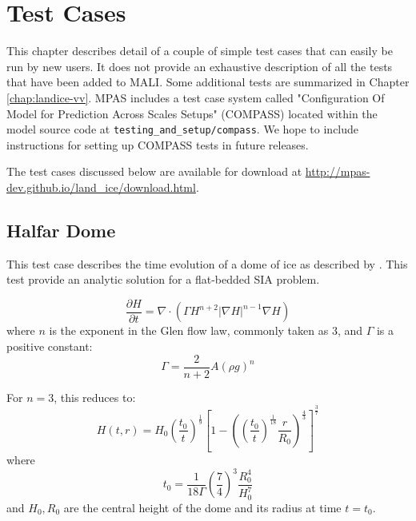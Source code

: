 \chapter{Test Cases}
\label{chap:landice_test_cases}

This chapter describes detail of a couple of simple test cases that can easily be
run by new users.
It does not provide an exhaustive description of all the tests that have been added to MALI.
Some additional tests are summarized in Chapter \ref{chap:landice-vv}.
MPAS includes a test case system called "Configuration Of Model for Prediction Across Scales Setups" (COMPASS)
located within the model source code at {\tt testing\_and\_setup/compass}.
We hope to include instructions for setting up COMPASS tests in future releases.

The test cases discussed below are available for download at \url{http://mpas-dev.github.io/land_ice/download.html}.


\FloatBarrier


\section{Halfar Dome}
\label{sec:halfar_description}
This test case describes the time evolution of a dome of ice as described by \citet{Halfar1983}.
This test provide an analytic solution for a flat-bedded SIA problem.

\begin{equation}
    \frac{\partial H}{\partial t} = \nabla \cdot (\Gamma H^{n+2} |\nabla H|^{n-1} \nabla H)
\end{equation}
where $n$ is the exponent in the Glen flow law, commonly taken as 3, and $\Gamma$ is a positive constant:
\begin{equation}
    \Gamma = \frac{2}{n+2} A (\rho g)^n
\end{equation}

For $n=3$, this reduces to:
\begin{equation}
    H(t,r) = H_0 \left(\frac{t_0}{t}\right)^\frac{1}{9}  \left[ 1 - \left(  \left( \frac{t_0}{t} \right) ^ \frac{1}{18} \frac{r}{R_0} \right)^\frac{4}{3} \right] ^ \frac{3}{7}
\end{equation}
where
\begin{equation}
    t_0 = \frac{1}{18\Gamma} \left( \frac{7}{4} \right)^3 \frac{R_0^4}{H_0^7}
\end{equation}
and $H_0, R_0$ are the central height of the dome and its radius at time $t=t_0$.

